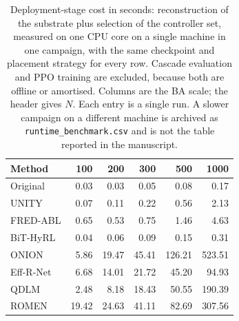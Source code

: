 \begin{table}[!htbp]
\centering
\small
\setlength{\tabcolsep}{4pt}
\caption{Deployment-stage cost in seconds: reconstruction of the substrate plus selection of the controller set, measured on one CPU core on a single machine in one campaign, with the same checkpoint and placement strategy for every row. Cascade evaluation and PPO training are excluded, because both are offline or amortised. Columns are the BA scale; the header gives $N$. Each entry is a single run. A slower campaign on a different machine is archived as \texttt{runtime\_benchmark.csv} and is not the table reported in the manuscript.}
\label{tab:runtime}
\begin{tabular}{@{}l *{5}{r}@{}}
\toprule
\textbf{Method} & \textbf{100} & \textbf{200} & \textbf{300} & \textbf{500} & \textbf{1000} \\
\midrule
Original & 0.03 & 0.03 & 0.05 & 0.08 & 0.17 \\
UNITY & 0.07 & 0.11 & 0.22 & 0.56 & 2.13 \\
FRED-ABL & 0.65 & 0.53 & 0.75 & 1.46 & 4.63 \\
\midrule
BiT-HyRL & 0.04 & 0.06 & 0.09 & 0.15 & 0.31 \\
ONION & 5.86 & 19.47 & 45.41 & 126.21 & 523.51 \\
Eff-R-Net & 6.68 & 14.01 & 21.72 & 45.20 & 94.93 \\
QDLM & 2.48 & 8.18 & 18.43 & 50.55 & 190.39 \\
ROMEN & 19.42 & 24.63 & 41.11 & 82.69 & 307.56 \\
\bottomrule
\end{tabular}
\end{table}
